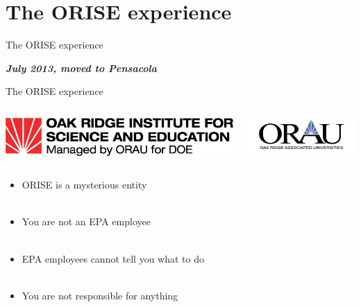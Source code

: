 \documentclass[serif]{beamer}\usepackage[]{graphicx}\usepackage[]{color}
\newcommand{\emtxt}[1]{\textbf{\textit{#1}}}
\begin{document}
\section{The ORISE experience}

\begin{frame}{The ORISE experience}{}
\centerline{\emtxt{July 2013, moved to Pensacola}}
\vspace{0.15in}
\centerline{}
\end{frame}

\begin{frame}{The ORISE experience}{}
\begin{columns}
\begin{column}{0.67\textwidth}
\includegraphics[width=\textwidth]{fig/orise.jpg}
\end{column}
\begin{column}{0.33\textwidth}
\includegraphics[width=\textwidth]{fig/orau.jpg}
\end{column}
\end{columns}
\vspace{0.2in}
\begin{itemize}
\item<2-> ORISE is a mysterious entity \\~\\
\item<3-> You are not an EPA employee \\~\\
\item<4-> EPA employees cannot tell you what to do \\~\\
\item<5-> You are not responsible for anything
\end{itemize}
\end{frame}
\end{document}
